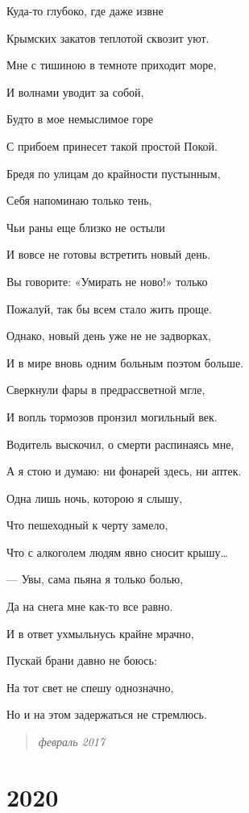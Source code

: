 \documentclass[
  a5paperpaper,
  DIV=11,
  numbers=noendperiod]{scrreprt}
\begin{document}
Куда-то глубоко, где даже извне

Крымских закатов теплотой сквозит уют.

Мне с тишиною в темноте приходит море,

И волнами уводит за собой,

Будто в мое немыслимое горе

С прибоем принесет такой простой Покой.

Бредя по улицам до крайности пустынным,

Себя напоминаю только тень,

Чьи раны еще близко не остыли

И вовсе не готовы встретить новый день.

Вы говорите: «Умирать не ново!» только

Пожалуй, так бы всем стало жить проще.

Однако, новый день уже не не задворках,

И в мире вновь одним больным поэтом больше.

Сверкнули фары в предрассветной мгле,

И вопль тормозов пронзил могильный век.

Водитель выскочил, о смерти распинаясь мне,

А я стою и думаю: ни фонарей здесь, ни аптек.

Одна лишь ночь, которою я слышу,

Что пешеходный к черту замело,

Что с алкоголем людям явно сносит крышу\ldots{}

--- Увы, сама пьяна я только болью,

Да на снега мне как-то все равно.

И в ответ ухмыльнусь крайне мрачно,

Пускай брани давно не боюсь:

На тот свет не спешу однозначно,

Но и на этом задержаться не стремлюсь.

\begin{quote}
\emph{февраль 2017}
\end{quote}


\chapter*{2020}\label{section-8}
\end{document}
